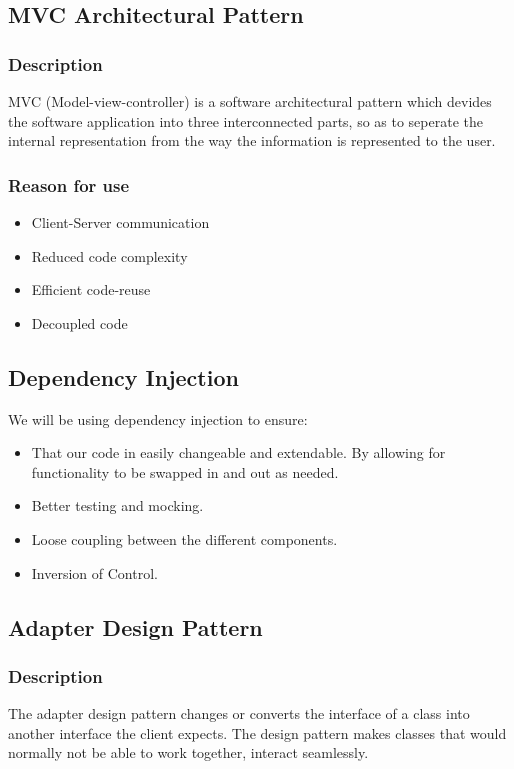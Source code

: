 \subsection{MVC Architectural Pattern}
	\subsubsection{Description}
	MVC (Model-view-controller) is a software architectural pattern which devides the software application into three interconnected parts, so as to seperate the internal representation from the way the information is represented to the user.
	\subsubsection{Reason for use}
	\begin{itemize}
		\item{Client-Server communication}
		\item{Reduced code complexity}
		\item{Efficient code-reuse}
		\item{Decoupled code}
	\end{itemize}
	
\subsection {Dependency Injection}
	We will be using dependency injection to ensure:
	\begin{itemize}
		\item That our code in easily changeable and extendable. By allowing for functionality to be swapped in and out as needed. \cite{dependency1}
		\item Better testing and mocking. \cite{dependency1}
		\item Loose coupling between the different components. \cite{dependency2}
		\item Inversion of Control. \cite{dependency2}
	\end{itemize}

\subsection{Adapter Design Pattern}
	\subsubsection{Description}
	The adapter design pattern changes or converts the interface of a class into another interface the client expects. The design pattern makes classes that would normally not be able to work together, interact seamlessly.
	
